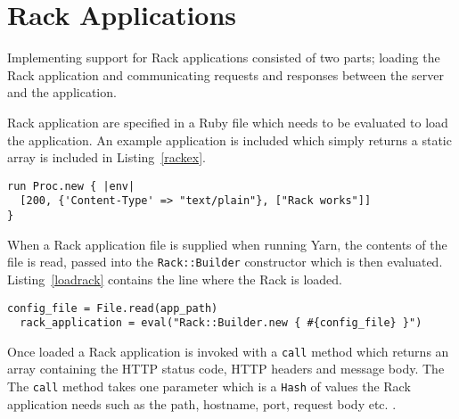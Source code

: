 \section{Rack Applications}
\label{rack}
Implementing support for Rack applications consisted of two parts; loading the
Rack application and communicating requests and responses between the server
and the application.

Rack application are specified in a Ruby file which needs to be evaluated to
load the application. An example application is included which simply returns
a static array is included in Listing~\ref{rackex}.

\bigskip
\begin{lstlisting}[label=rackex,caption=Sample Rack application. (test\_objects/config.ru:4)]
run Proc.new { |env|
  [200, {'Content-Type' => "text/plain"}, ["Rack works"]]
}
\end{lstlisting}

When a Rack application file is supplied when running Yarn, the contents of
the file is read, passed into the \texttt{Rack::Builder} constructor which is
then evaluated. Listing~\ref{loadrack} contains the line where the Rack is
loaded.

\bigskip
\begin{lstlisting}[label=loadrack,caption=Loading a Rack application.
(lib/yarn/server.rb:31)]
  config_file = File.read(app_path)
  rack_application = eval("Rack::Builder.new { #{config_file} }")
\end{lstlisting}

Once loaded a Rack application is invoked with a \texttt{call} method which
returns an array containing the HTTP status code, HTTP headers and message
body. The The \texttt{call} method takes one parameter which is a
\texttt{Hash} of values the Rack application needs such as the path, hostname,
port, request body etc. \cite{rackspec}. 




